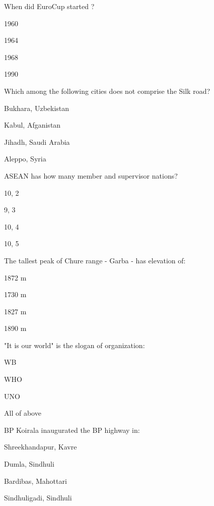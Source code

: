 \begin{questions}
\question When did EuroCup started ?
  \begin{items}
  \item* 1960
  \item 1964
  \item 1968
  \item 1990
  \end{items}

\question Which among the following cities does not comprise the Silk road?
  \begin{items}
  \item Bukhara, Uzbekistan
  \item Kabul, Afganistan
  \item* Jihadh, Saudi Arabia
  \item Aleppo, Syria
  \end{items}

\question ASEAN has how many member and supervisor nations?
  \begin{items}
  \item* 10, 2
  \item 9, 3
  \item 10, 4
  \item 10, 5
  \end{items}

\question The tallest peak of Chure range - Garba - has elevation of:
  \begin{items}
  \item* 1872 m
  \item 1730 m
  \item 1827 m
  \item 1890 m
  \end{items}

\question "It is our world" is the slogan of \fillin[][3cm] organization:
  \begin{items}
  \item WB
  \item WHO
  \item* UNO
  \item All of above
  \end{items}

\question BP Koirala inaugurated the BP highway in:
  \begin{items}
  \item* Shreekhandapur, Kavre
  \item Dumla, Sindhuli
  \item Bardibas, Mahottari
  \item Sindhuligadi, Sindhuli
  \end{items}


\end{questions}
